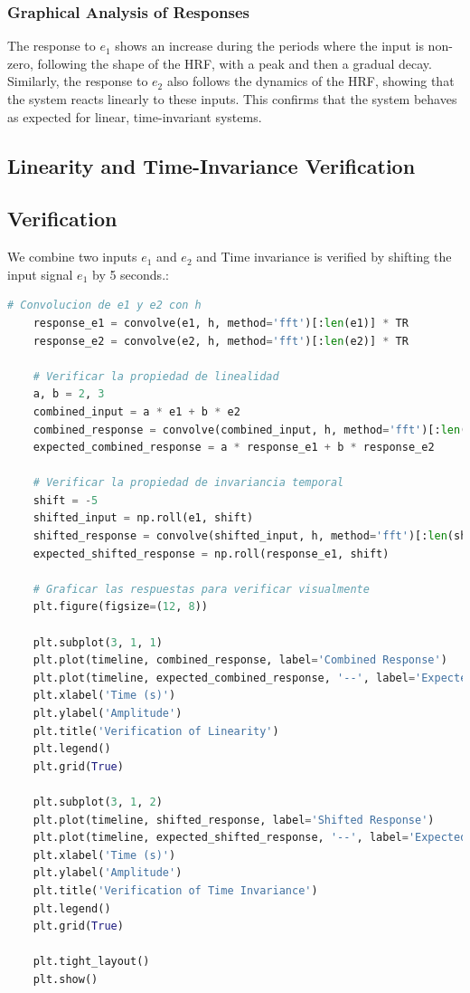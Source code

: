 \documentclass[10pt]{article}
\theoremstyle{definition}
\theoremstyle{remark}
\theoremstyle{definition}
\numberwithin{equation}{prob}
\begin{document}
\subsubsection{Graphical Analysis of Responses}

The response to $e_1$ shows an increase during the periods where the input is non-zero, following the shape of the HRF, with a peak and then a gradual decay. Similarly, the response to $e_2$ also follows the dynamics of the HRF, showing that the system reacts linearly to these inputs. This confirms that the system behaves as expected for linear, time-invariant systems.


\subsection{Linearity and Time-Invariance Verification}

\subsection*{Verification}
We combine two inputs $e_1$ and $e_2$ and Time invariance is verified by shifting the input signal $e_1$ by 5 seconds.:

\begin{lstlisting}[language=Python]
    # Convolucion de e1 y e2 con h
    response_e1 = convolve(e1, h, method='fft')[:len(e1)] * TR
    response_e2 = convolve(e2, h, method='fft')[:len(e2)] * TR
    
    # Verificar la propiedad de linealidad
    a, b = 2, 3
    combined_input = a * e1 + b * e2
    combined_response = convolve(combined_input, h, method='fft')[:len(combined_input)] * TR
    expected_combined_response = a * response_e1 + b * response_e2
    
    # Verificar la propiedad de invariancia temporal
    shift = -5
    shifted_input = np.roll(e1, shift)
    shifted_response = convolve(shifted_input, h, method='fft')[:len(shifted_input)] * TR
    expected_shifted_response = np.roll(response_e1, shift)
    
    # Graficar las respuestas para verificar visualmente
    plt.figure(figsize=(12, 8))
    
    plt.subplot(3, 1, 1)
    plt.plot(timeline, combined_response, label='Combined Response')
    plt.plot(timeline, expected_combined_response, '--', label='Expected Combined Response')
    plt.xlabel('Time (s)')
    plt.ylabel('Amplitude')
    plt.title('Verification of Linearity')
    plt.legend()
    plt.grid(True)
    
    plt.subplot(3, 1, 2)
    plt.plot(timeline, shifted_response, label='Shifted Response')
    plt.plot(timeline, expected_shifted_response, '--', label='Expected Shifted Response')
    plt.xlabel('Time (s)')
    plt.ylabel('Amplitude')
    plt.title('Verification of Time Invariance')
    plt.legend()
    plt.grid(True)
    
    plt.tight_layout()
    plt.show()
\end{lstlisting}
\end{document}
